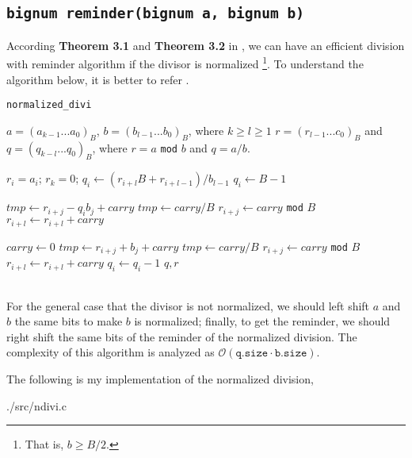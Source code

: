 \subsection{\texttt{bignum reminder(bignum a, bignum b)}}
According \textbf{Theorem 3.1} and \textbf{Theorem 3.2} in \cite{ntb2}, we can
have an efficient division with reminder algorithm if the divisor is normalized
\footnote{That is, $b \geq B/2$.}. To understand the algorithm below, it is
better to refer \cite{ntb2}.
\begin{algorithm} 
\caption{\texttt{normalized\_divi}}
  \begin{algorithmic}[1]
    \Require $a = (a_{k-1}...a_0)_B$, $b = (b_{l-1}...b_0)_B$, where $k \geq l \geq
    1$
    \Ensure $r = (r_{l-1}...c_0)_B$ and $q = (q_{k-l}...q_0)_B$, where $r = a
    $ \texttt{mod} $b$ and $q = a / b$.

      \State $r_i = a_i$;
    \EndFor
    \State $r_k = 0$;
      \State $q_i \gets (r_{i+l}B+r_{i+l-1})/b_{l-1}$
        \State $q_i \gets B-1$
      \EndIf

        \State $tmp \gets r_{i+j} - q_ib_j + carry$
        \State $tmp \gets carry / B$
        \State $r_{i+j} \gets carry$ \texttt{mod} $B$
      \EndFor
      \State $r_{i+l} \gets r_{i+l} + carry$

        \State $carry \gets 0$
          \State $tmp \gets r_{i+j} + b_j + carry$
          \State $tmp \gets carry / B$
          \State $r_{i+j} \gets carry$ \texttt{mod} $B$
	\EndFor
        \State $r_{i+l} \gets r_{i+l} + carry$
	\State $q_i \gets q_i -1$
      \EndWhile
      \State \Return $q, r$
    \EndFor
  \end{algorithmic}
\end{algorithm}\\
For the general case that the divisor is not normalized, we should left shift
$a$ and $b$ the same bits to make $b$ is normalized; finally, to get the
reminder, we should right shift the same bits of the reminder of the normalized division.
The complexity of this algorithm is analyzed as
$\mathcal{O}(\texttt{q.size}\cdot \texttt{b.size})$.

The following is my implementation of the normalized division,

{./src/ndivi.c}


